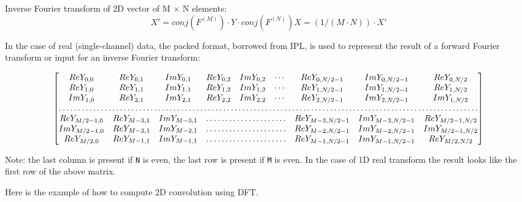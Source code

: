 Inverse Fourier transform of 2D vector of M $\times$ N elements:
\[X'= conj(F^{(M)}) \cdot Y \cdot conj(F^{(N)})
X = (1/(M \cdot N)) \cdot X'\]


In the case of real (single-channel) data, the packed format, borrowed from IPL, is used to represent the result of a forward Fourier transform or input for an inverse Fourier transform:

\[\begin{bmatrix}
Re Y_{0,0} & Re Y_{0,1} & Im Y_{0,1} & Re Y_{0,2} & Im Y_{0,2} & \cdots & Re Y_{0,N/2-1} & Im Y_{0,N/2-1} & Re Y_{0,N/2} \\
Re Y_{1,0} & Re Y_{1,1} & Im Y_{1,1} & Re Y_{1,2} & Im Y_{1,2} & \cdots & Re Y_{1,N/2-1} & Im Y_{1,N/2-1} & Re Y_{1,N/2} \\
Im Y_{1,0} & Re Y_{2,1} & Im Y_{2,1} & Re Y_{2,2} & Im Y_{2,2} & \cdots & Re Y_{2,N/2-1} & Im Y_{2,N/2-1} & Im Y_{1,N/2} \\
\hdotsfor{9} \\
Re Y_{M/2-1,0} &  Re Y_{M-3,1}  & Im Y_{M-3,1} & \hdotsfor{3} & Re Y_{M-3,N/2-1} & Im Y_{M-3,N/2-1}& Re Y_{M/2-1,N/2} \\
Im Y_{M/2-1,0} &  Re Y_{M-2,1}  & Im Y_{M-2,1} & \hdotsfor{3} & Re Y_{M-2,N/2-1} & Im Y_{M-2,N/2-1}& Im Y_{M/2-1,N/2} \\
Re Y_{M/2,0}  &  Re Y_{M-1,1} &  Im Y_{M-1,1} & \hdotsfor{3} & Re Y_{M-1,N/2-1} & Im Y_{M-1,N/2-1}& Re Y_{M/2,N/2}
\end{bmatrix}
\]


Note: the last column is present if \texttt{N} is even, the last row is present if \texttt{M} is even.
In the case of 1D real transform the result looks like the first row of the above matrix.

Here is the example of how to compute 2D convolution using DFT.

